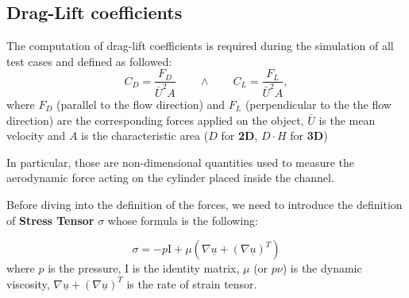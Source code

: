 \documentclass[11pt,a4paper]{article}
\renewcommand{\vec}[1]{\underline{#1}} %
\begin{document}
\begin{center}
    \label{fig:3d_domain_cylinder}
\end{center}

\subsection{Drag-Lift coefficients}

The computation of drag-lift coefficients is required during the simulation of all test cases and defined as followed:
\begin{equation}
\label{eq:drag_lift_coeff}
    C_D = \frac{F_D}{\bar{U}^2 A} \qquad \wedge \qquad C_L = \frac{F_L}{\bar{U}^2 A},
\end{equation}
where $F_D$ (parallel to the flow direction) and $F_L$ (perpendicular to the the flow direction) are the corresponding forces applied on the object, $\bar{U}$ is the mean velocity and $A$ is the characteristic area ($D$ for \textbf{2D}, $D \cdot H$ for \textbf{3D}) 

In particular, those are non-dimensional quantities used to measure the aerodynamic force acting on the cylinder placed inside the channel.

Before diving into the definition of the forces, we need to introduce the definition of \textbf{Stress Tensor} $\sigma$ whose formula is the following:

\begin{equation*}
    \sigma = -p\text{I} + \mu (\nabla \vec{u} + (\nabla \vec{u})^T)
\end{equation*}
where $p$ is the pressure, $\text{I}$ is the identity matrix, $\mu$ (or $p\nu$) is the dynamic viscosity, $\nabla \vec{u} + (\nabla \vec{u})^T$ is the rate of strain tensor.
\end{document}
